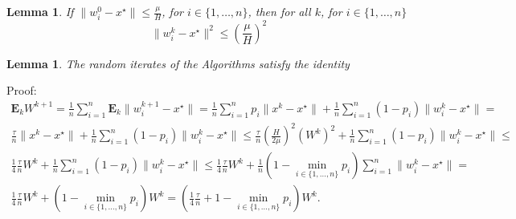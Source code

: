 \documentclass{article}
\newtheorem{lemma}[theorem]{Lemma}
\begin{document}
\begin{lemma}
If $\|w_i^0 - x^\star\| \leq \frac{\mu}{H}$, for $i \in \{1, \dots, n\}$, then for all $k$, for $i \in \{1, \dots, n\}$
\begin{equation}
    \|w_i^k - x^\star\|^2 \leq \left(\frac{\mu}{H}\right)^2
\end{equation}
\end{lemma}

\begin{lemma} The random iterates of the Algorithms satisfy the identity
\end{lemma}
Proof:
\begin{equation*}
\begin{split}
    \mathbf{E}_k W^{k + 1} = \frac{1}{n}\sum\limits_{i=1}^{n}\mathbf{E}_k\|w_i^{k + 1} - x^\star\| =
     \frac{1}{n}\sum\limits_{i=1}^{n}p_i\|x^k - x^\star\| + \frac{1}{n}\sum\limits_{i=1}^{n}(1 - p_i)\|w_i^k - x^\star\| = \\
     \frac{\tau}{n}\|x^k - x^\star\| + \frac{1}{n}\sum\limits_{i=1}^{n}(1 - p_i)\|w_i^k - x^\star\| \leq
     \frac{\tau}{n}\left(\frac{H}{2\mu}\right)^2\left(W^k\right)^2 + \frac{1}{n}\sum\limits_{i=1}^{n}(1 - p_i)\|w_i^k - x^\star\| \leq \\
     \frac{1}{4}\frac{\tau}{n}W^k + \frac{1}{n}\sum\limits_{i=1}^{n}(1 - p_i)\|w_i^k - x^\star\| \leq \frac{1}{4}\frac{\tau}{n}W^k + \frac{1}{n}(1 - \min_{i \in \{1, \dots, n\}}{p_i})\sum\limits_{i=1}^{n}\|w_i^k - x^\star\|  = \\ \frac{1}{4}\frac{\tau}{n}W^k + (1 - \min_{i \in \{1, \dots, n\}}{p_i})W^k =  \left(\frac{1}{4}\frac{\tau}{n} + 1 - \min_{i \in \{1, \dots, n\}}{p_i}\right)W^k.
\end{split}
\end{equation*}

\newpage
{}

\printbibliography
\end{document}
